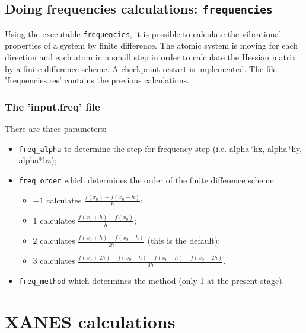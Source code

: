 \documentclass[a4paper,11pt]{report}
\begin{document}
\section{Doing frequencies calculations: \texttt{frequencies}}
Using the executable \texttt{frequencies}, it is possible to calculate the vibrational properties of
a system by finite difference. The atomic system is moving for each direction and each atom in a
small step in order to calculate the Hessian matrix by a finite difference scheme.
A checkpoint restart is implemented. The file 'frequencies.res' contains the previous calculations.

\subsection{The 'input.freq' file}
There are three parameters:
\begin{itemize}
\item \texttt{freq\_alpha} to determine the step for frequency step (i.e. alpha*hx, alpha*hy, alpha*hz);
\item \texttt{freq\_order} which determines the order of the finite difference scheme:
      \begin{itemize}
      \item $-1$ calculates $\frac{f(x_0)-f(x_0-h)}{h}$;
      \item $1$ calculates $\frac{f(x_0+h)-f(x_0)}{h}$;
      \item $2$ calculates $\frac{f(x_0+h)-f(x_0-h)}{2h}$ (this is the default);
      \item $3$ calculates $\frac{f(x_0+2h)+f(x_0+h)-f(x_0-h)-f(x_0-2h)}{6h}$.
      \end{itemize}
\item \texttt{freq\_method} which determines the method (only 1 at the present stage).
\end{itemize}


\chapter{XANES calculations}
\end{document}
